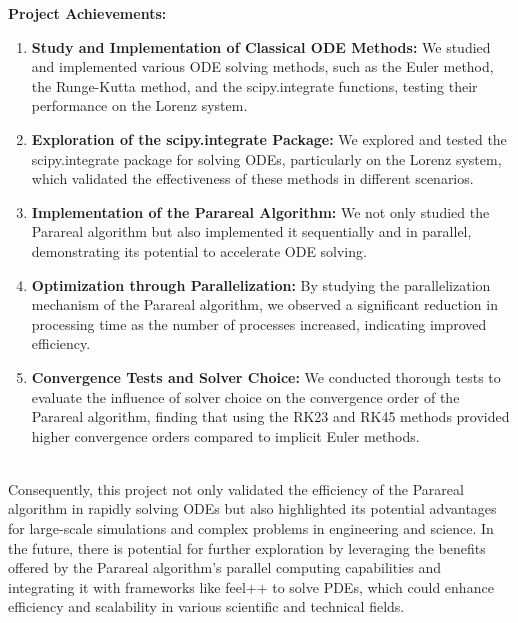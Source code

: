 \documentclass[a4paper,12pt,french]{article}
\begin{document}
\textbf{Project Achievements:}
\begin{enumerate}
    \item \textbf{Study and Implementation of Classical ODE Methods:} We studied and implemented various ODE solving methods, such as the Euler method, the Runge-Kutta method, and the scipy.integrate functions, testing their performance on the Lorenz system.
    \item \textbf{Exploration of the scipy.integrate Package:} We explored and tested the scipy.integrate package for solving ODEs, particularly on the Lorenz system, which validated the effectiveness of these methods in different scenarios.
    \item \textbf{Implementation of the Parareal Algorithm:} We not only studied the Parareal algorithm but also implemented it sequentially and in parallel, demonstrating its potential to accelerate ODE solving.
    \item \textbf{Optimization through Parallelization:} By studying the parallelization mechanism of the Parareal algorithm, we observed a significant reduction in processing time as the number of processes increased, indicating improved efficiency.
    \item \textbf{Convergence Tests and Solver Choice:} We conducted thorough tests to evaluate the influence of solver choice on the convergence order of the Parareal algorithm, finding that using the RK23 and RK45 methods provided higher convergence orders compared to implicit Euler methods.
\end{enumerate}\\

Consequently, this project not only validated the efficiency of the Parareal algorithm in rapidly solving ODEs but also highlighted its potential advantages for large-scale simulations and complex problems in engineering and science. In the future, there is potential for further exploration by leveraging the benefits offered by the Parareal algorithm's parallel computing capabilities and integrating it with frameworks like feel++ to solve PDEs, which could enhance efficiency and scalability in various scientific and technical fields.

\newpage

\vspace*{\fill}

\end{document}
